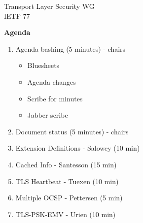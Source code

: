 \documentclass[helvetica]{seminar}
\newcommand{\heading}[1]{%
  \begin{center} 
    \large\bf 
    #1 
  \end{center} 
  \vspace{.4 in}}
\begin{document}
\begin{slide}
\begin{center}
\vspace{1 in}
\LARGE{{\bf}Transport Layer Security WG}\\
\large{{IETF 77}} \\
\end{center}
\end{slide}


\centerslidesfalse 

\begin{slide}
\heading{Agenda}

{\tiny
\begin{enumerate}
\item Agenda bashing (5 minutes) - chairs
\begin{itemize}
\item Bluesheets
\item Agenda changes
\item Scribe for minutes
\item Jabber scribe
\end{itemize}
\item Document status (5 minutes) - chairs
\item Extension Definitions - Salowey (10 min)
\item Cached Info - Santesson (15 min)
\item TLS Heartbeat - Tuexen (10 min)
\item Multiple OCSP - Pettersen (5 min)
\item TLS-PSK-EMV -  Urien (10 min)
\end{enumerate}
}
\end{slide}
\end{document}
